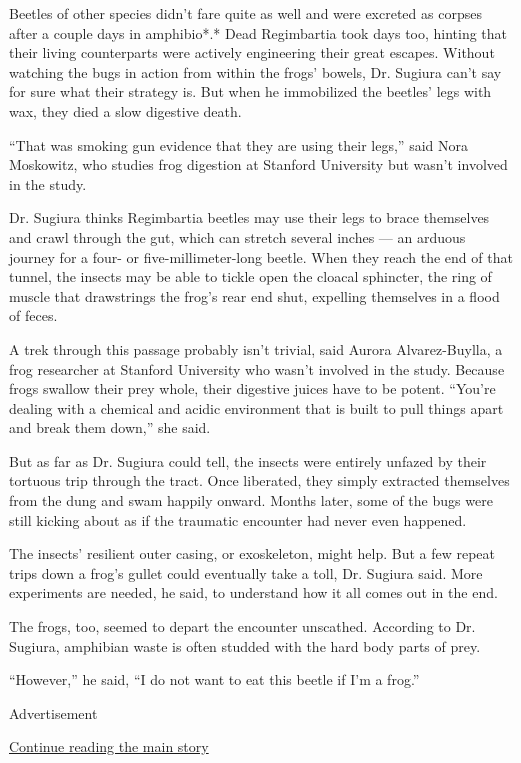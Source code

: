 Beetles of other species didn't fare quite as well and were excreted as
corpses after a couple days in amphibio*.* Dead Regimbartia took days
too, hinting that their living counterparts were actively engineering
their great escapes. Without watching the bugs in action from within the
frogs' bowels, Dr. Sugiura can't say for sure what their strategy is.
But when he immobilized the beetles' legs with wax, they died a slow
digestive death.

``That was smoking gun evidence that they are using their legs,'' said
Nora Moskowitz, who studies frog digestion at Stanford University but
wasn't involved in the study.

Dr. Sugiura thinks Regimbartia beetles may use their legs to brace
themselves and crawl through the gut, which can stretch several inches
--- an arduous journey for a four- or five-millimeter-long beetle. When
they reach the end of that tunnel, the insects may be able to tickle
open the cloacal sphincter, the ring of muscle that drawstrings the
frog's rear end shut, expelling themselves in a flood of feces.

A trek through this passage probably isn't trivial, said Aurora
Alvarez-Buylla, a frog researcher at Stanford University who wasn't
involved in the study. Because frogs swallow their prey whole, their
digestive juices have to be potent. ``You're dealing with a chemical and
acidic environment that is built to pull things apart and break them
down,'' she said.

But as far as Dr. Sugiura could tell, the insects were entirely unfazed
by their tortuous trip through the tract. Once liberated, they simply
extracted themselves from the dung and swam happily onward. Months
later, some of the bugs were still kicking about as if the traumatic
encounter had never even happened.

The insects' resilient outer casing, or exoskeleton, might help. But a
few repeat trips down a frog's gullet could eventually take a toll, Dr.
Sugiura said. More experiments are needed, he said, to understand how it
all comes out in the end.

The frogs, too, seemed to depart the encounter unscathed. According to
Dr. Sugiura, amphibian waste is often studded with the hard body parts
of prey.

``However,'' he said, ``I do not want to eat this beetle if I'm a
frog.''

Advertisement

\protect\hyperlink{after-bottom}{Continue reading the main story}

